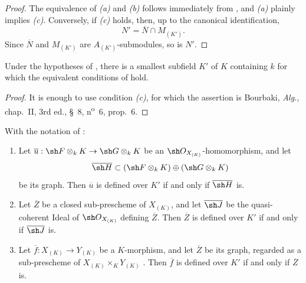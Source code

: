 \begin{proof}
The equivalence of \emph{(a)} and \emph{(b)} follows immediately from
, and \emph{(a)} plainly implies \emph{(c)}.
Conversely, if \emph{(c)} holds, then, up to the canonical
identification,
\[
N'=\overline N\cap M_{(K')}.
\]
Since $\overline N$ and $M_{(K')}$ are $A_{(K')}$-submodules, so is
$N'$.
\end{proof}

\begin{corollary}[4.8.7]
\label{IV.4.8.7}
Under the hypotheses of , there is a smallest subfield
$K'$ of $K$ containing $k$ for which the equivalent conditions of
 hold.
\end{corollary}

\begin{proof}
It is enough to use condition \emph{(c)}, for which the assertion is
Bourbaki, \emph{Alg.}, chap.~II, 3rd ed., \S~8,
n\textsuperscript{o}~6, prop.~6.
\end{proof}

\begin{lemma}[4.8.8]
\label{IV.4.8.8}
With the notation of :
\begin{enumerate}
\item[\rm(i)]
\label{IV.4.8.8.i}
Let
$\overline u:\sh F\otimes_kK\to\sh G\otimes_kK$ be an
$\sh O_{X_{(K)}}$-homomorphism, and let
\[
\overline{\sh H}\subset
(\sh F\otimes_kK)\oplus(\sh G\otimes_kK)
\]
be its graph.
Then $\overline u$ is defined over $K'$ if and only if
$\overline{\sh H}$ is.

\item[\rm(ii)]
\label{IV.4.8.8.ii}
Let $\overline Z$ be a closed sub-prescheme of $X_{(K)}$, and let
$\overline{\sh J}$ be the quasi-coherent Ideal of
$\sh O_{X_{(K)}}$ defining $\overline Z$.
Then $\overline Z$ is defined over $K'$ if and only if
$\overline{\sh J}$ is.

\item[\rm(iii)]
\label{IV.4.8.8.iii}
Let $\overline f:X_{(K)}\to Y_{(K)}$ be a $K$-morphism, and let
$\overline Z$ be its graph, regarded as a sub-prescheme of
$X_{(K)}\times_KY_{(K)}$ .
Then $\overline f$ is defined over $K'$ if and only if
$\overline Z$ is.
\end{enumerate}
\end{lemma}

